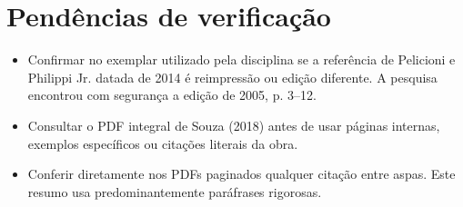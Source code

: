 \documentclass[12pt,a4paper]{article}
\begin{document}
\section{Pendências de verificação}

\begin{itemize}
\item Confirmar no exemplar utilizado pela disciplina se a referência de Pelicioni e Philippi Jr. datada de 2014 é reimpressão ou edição diferente. A pesquisa encontrou com segurança a edição de 2005, p. 3--12.
\item Consultar o PDF integral de Souza (2018) antes de usar páginas internas, exemplos específicos ou citações literais da obra.
\item Conferir diretamente nos PDFs paginados qualquer citação entre aspas. Este resumo usa predominantemente paráfrases rigorosas.
\end{itemize}
\end{document}
